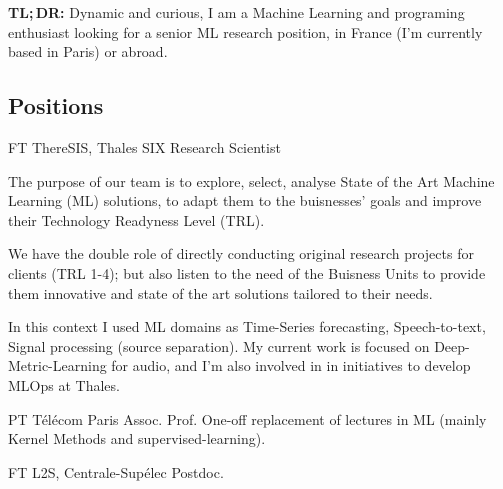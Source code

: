 \documentclass[10pt]{article} %
\begin{document}
\vspace{-1.75cm}
\begin{center}
    \textbf{TL;\,DR:} Dynamic and curious, I am a Machine Learning and
    programing enthusiast looking for a senior ML research position, in France
    (I'm currently based in Paris) or abroad.
\end{center}
\vspace{-3.5mm}
\begin{paracol}{2}
%
%
\section{Positions}
%
%
%
%
%
{FT} %
{ThereSIS, Thales SIX} %
{Research Scientist} %
{The purpose of our team is to explore, select, analyse State of the Art
  Machine Learning (ML) solutions, to adapt them to the buisnesses'
  goals and improve their Technology Readyness Level (TRL). \par
  We have the double role of directly conducting original research
  projects for clients (TRL 1-4); but also listen to the need of the
  Buisness Units to provide them innovative and state of the art
  solutions tailored to their needs.  \par
  In this context I used ML domains as Time-Series forecasting,
  Speech-to-text, Signal processing (source separation). My current work
  is focused on Deep-Metric-Learning for audio, and I'm also involved in
  in initiatives to develop MLOps at Thales.}\par %
{PT} %
{T\'el\'ecom Paris} %
{Assoc. Prof.} %
{One-off replacement of lectures in ML (mainly Kernel Methods and
  supervised-learning).}\par
{} %
{FT} %
{L2S, Centrale-Sup\'elec} %
{Postdoc.} %

\end{paracol}
\end{document}
